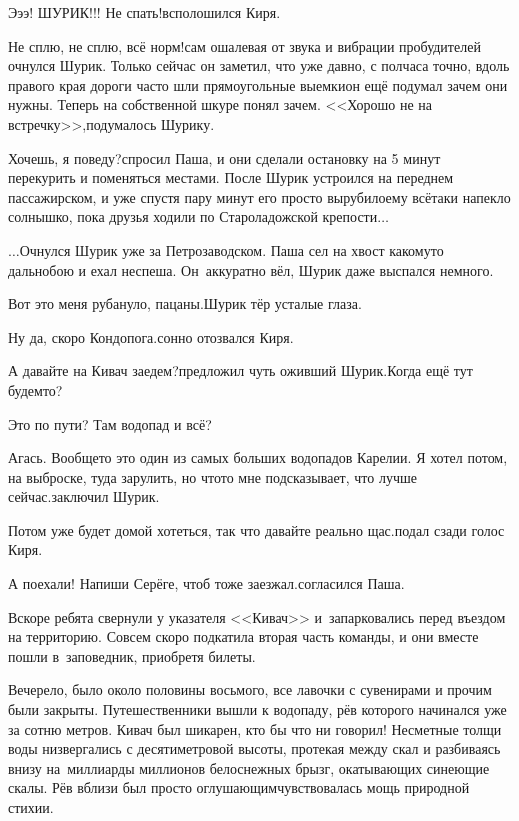 \diagdash Э\sdash э\sdash э! ШУРИК!!! Не спать!\mdash всполошился Киря.

\diagdash Не сплю, не сплю, всё норм!\mdash сам ошалевая от звука и вибрации пробудителей очнулся Шурик. Только сейчас он заметил, что уже давно, с полчаса точно, вдоль правого края дороги часто шли прямоугольные выемки\mdash он ещё подумал зачем они нужны. Теперь на собственной шкуре понял зачем. <<Хорошо не на встречку>>,\mdash подумалось Шурику.

\diagdash Хочешь, я поведу?\mdash спросил Паша, и они сделали остановку на 5 минут перекурить и поменяться местами. После Шурик устроился на переднем пассажирском, и уже спустя пару минут его просто вырубило\mdash ему всё\sdash таки напекло солнышко, пока друзья ходили по Староладожской крепости$\ldots$

\vspace{0.5cm}

$\ldots$Очнулся Шурик уже за Петрозаводском. Паша сел на хвост какому\sdash то дальнобою и ехал неспеша. Он~аккуратно вёл, Шурик даже выспался немного.

\diagdash Вот это меня рубануло, пацаны.\mdash Шурик тёр усталые глаза.

\diagdash Ну да, скоро Кондопога.\mdash сонно отозвался Киря.

\diagdash А давайте на Кивач заедем?\mdash предложил чуть оживший Шурик.\mdash Когда ещё тут будем\sdash то?

\diagdash Это по пути? Там водопад и всё?

\diagdash Агась. Вообще\sdash то это один из самых больших водопадов Карелии. Я хотел потом, на выброске, туда зарулить, но что\sdash то мне подсказывает, что лучше сейчас.\mdash заключил Шурик.

\diagdash Потом уже будет домой хотеться, так что давайте реально щас.\mdash подал сзади голос Киря.

\diagdash А поехали! Напиши Серёге, чтоб тоже заезжал.\mdash согласился Паша.

Вскоре ребята свернули у указателя <<Кивач>> и~запарковались перед въездом на территорию. Совсем скоро подкатила вторая часть команды, и они вместе пошли в~заповедник, приобретя билеты.

Вечерело, было около половины восьмого, все лавочки с сувенирами и прочим были закрыты. Путешественники вышли к водопаду, рёв которого начинался уже за сотню метров. Кивач был шикарен, кто бы что ни говорил! Несметные толщи воды низвергались с десятиметровой высоты, протекая между скал и разбиваясь внизу на~миллиарды миллионов белоснежных брызг, окатывающих синеющие скалы. Рёв вблизи был просто оглушающим\mdash чувствовалась мощь природной стихии. 

